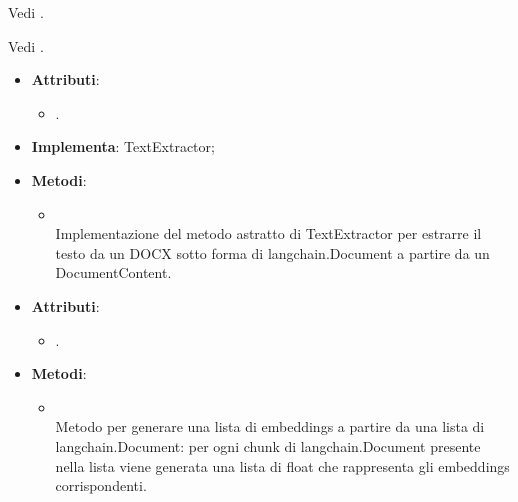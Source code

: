 \documentclass[10pt, a4paper]{article}
\begin{document}
Vedi .

Vedi .

\label{DocumentStatusDettaglio}
\begin{itemize}
    \item \textbf{Attributi}:
    \begin{itemize}
        \item {}.
    \end{itemize}
\end{itemize}

\label{DOCXTextExtractorDettaglio}
\begin{itemize}
    \item \textbf{Implementa}: TextExtractor;
    \item \textbf{Metodi}:
    \begin{itemize}
        \item {}\\
        Implementazione del metodo astratto di TextExtractor per estrarre il testo da un DOCX sotto forma di langchain.Document a partire da un DocumentContent.
    \end{itemize}
\end{itemize}

\label{EmbeddingsCreatorDettaglio}
\begin{itemize}
    \item \textbf{Attributi}:
    \begin{itemize}
        \item {}.
    \end{itemize}
    \item \textbf{Metodi}:
    \begin{itemize}
        \item {}\\
        Metodo per generare una lista di embeddings a partire da una lista di langchain.Document: per ogni chunk di langchain.Document presente nella lista viene generata una lista di float che rappresenta gli embeddings corrispondenti.
    \end{itemize}
\end{itemize}
\end{document}
